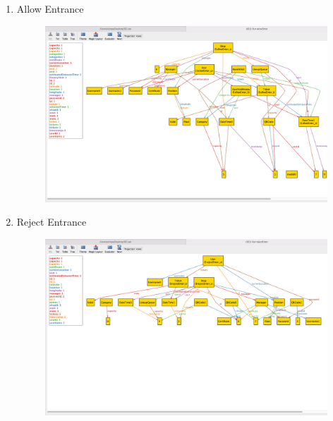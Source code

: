 \begin{enumerate}
    \item Allow Entrance \\
    \begin{figure}[H]
      \centering
      \includegraphics[width=0.9\textheight,keepaspectratio, angle=90]{images/alloy_AllowEnter.png}
    \end{figure}
    \clearpage
    
    \item Reject Entrance \\
    \begin{figure}[H]
      \centering
      \includegraphics[width=0.9\textheight,keepaspectratio, angle=90]{images/alloy_rejectEnter.png}
    \end{figure}
    \clearpage
    

\end{enumerate}
